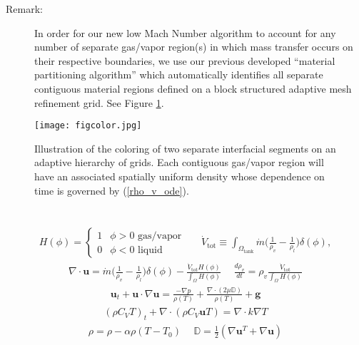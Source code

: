 \documentclass[]{article}
\begin{document}
Remark:
\begin{description}
\item[] In order for our new low Mach Number algorithm 
 to account for any number of separate gas/vapor region(s)
 in which mass transfer occurs on their respective boundaries,
 we use our previous developed ``material partitioning algorithm''
 \cite{SUSSMAN_OHTA2009,Sussman2012,wang2012hybrid} 
 which automatically identifies
 all separate contiguous material regions defined on a block structured
 adaptive mesh refinement grid.  See Figure \ref{partition}.
\end{description}

\begin{figure}[h]
\centering
\texttt{[image: figcolor.jpg]}
\caption{Illustration of the coloring of two separate interfacial segments
  on an adaptive hierarchy of grids.  Each contiguous gas/vapor region
  will have an associated spatially uniform density whose dependence
  on time is governed by (\ref{rho_v_ode}).
\label{partition}}
\end{figure}


\section*{} 
\begin{mymathbox}[title=Governing Equations - Low Mach Number Approach, colframe=blue!50!black]
	
\begin{eqnarray*}
H(\phi)=\left\{ \begin{array}{cc}
  1 & \phi>0 \mbox{ gas/vapor } \\
  0 & \phi<0 \mbox{ liquid }
 \end{array} \right.
\hspace{15pt}
\displaystyle \dot{V}_{\textrm{tot}} \equiv 
\int_{\Omega_{\textrm{tank}}} 
\dot{m}\big(\frac{1}{\rho_v}-\frac{1}{\rho_l}\big)\delta(\phi),
\end{eqnarray*}
\begin{eqnarray*}
\nabla \cdot \bm{u} =
\dot{m}\bigg(\frac{1}{\rho_v}-\frac{1}{\rho_l}\bigg)\delta(\phi) - 
\frac{\dot{V}_{\textrm{tot}} H(\phi)}{\int_{\Omega}H(\phi)}
\hspace{15pt}
\frac{d\rho_{v}}{dt}=\rho_{v}\frac{\dot{V}_{\textrm{tot}}}{\int_{\Omega}H(\phi)}
\end{eqnarray*}
\begin{eqnarray*}
\bm{u}_t +\bm{u}\cdot\nabla\bm{u} = 
\frac{-\nabla p}{\rho(T)} +
\frac{\nabla\cdot(2\mu \mathbb{D})}{\rho(T)}+\bm{g}
\end{eqnarray*}
\begin{eqnarray*}
(\rho C_V T)_t + \nabla\cdot(\rho C_V\bm{u}T) = \nabla\cdot k\nabla T
\end{eqnarray*}
\begin{eqnarray*}
\rho = \rho - \alpha\rho(T-T_{0}) \hspace{15pt}
\mathbb{D} = \frac{1}{2}(\nabla\bm{u}^T + \nabla\bm{u})
\end{eqnarray*}
\end{mymathbox}
		
\end{document}
